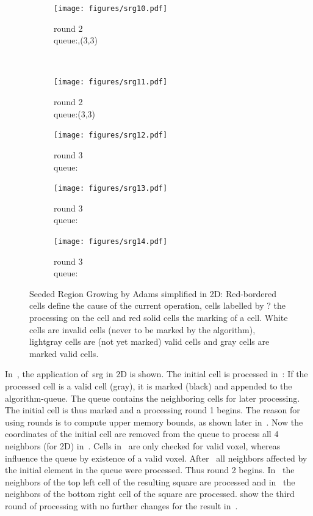 \documentclass{article}
\begin{document}
\begin{figure}[h]
\begin{subfigure}[b]{0.2\linewidth}
\centering
  \texttt{[image: figures/srg10.pdf]}
  \caption{round 2\\queue:,(3,3)}\label{fig:M10}%
\end{subfigure}\\%
\begin{subfigure}[b]{0.2\linewidth}%
\centering
  \texttt{[image: figures/srg11.pdf]}
\caption{round 2\\queue:(3,3)}\label{fig:M11}%
\end{subfigure}%
\begin{subfigure}[b]{0.2\linewidth}%
\centering
  \texttt{[image: figures/srg12.pdf]}
  \caption{round 3\\queue:}\label{fig:M12}%
\end{subfigure}%
\begin{subfigure}[b]{0.2\linewidth}%
\centering
  \texttt{[image: figures/srg13.pdf]}
\caption{round 3\\queue:}\label{fig:M13}%
\end{subfigure}%
\begin{subfigure}[b]{0.2\linewidth}%
\centering
  \texttt{[image: figures/srg14.pdf]}
\caption{round 3\\queue:}\label{fig:M14}%
\end{subfigure}%
\caption{Seeded Region Growing by Adams simplified in 2D: Red-bordered cells define the cause of the current operation, cells labelled by ? the processing on the cell and red solid cells the marking of a cell.
White cells are invalid cells (never to be marked by the algorithm), lightgray cells are (not yet marked) valid cells and gray cells are marked valid cells.} \label{fig:srg2d}
\end{figure}

In~, the application of~\ac{srg} in 2D is shown.
The initial cell is processed in~:
If the processed cell is a valid cell (gray), it is marked (black) and appended to the algorithm-queue.
The queue contains the neighboring cells for later processing.
The initial cell is thus marked and a processing round 1 begins.
The reason for using rounds is to compute upper memory bounds, as shown later in~.
Now the coordinates of the initial cell are removed from the queue to process all 4 neighbors (for 2D) in~.
Cells in~ are only checked for valid voxel, whereas~ influence the queue by existence of a valid voxel.
After~ all neighbors affected by the initial element in the queue were processed.
Thus round 2 begins.
In~ the neighbors of the top left cell of the resulting square are processed and in~ the neighbors of the bottom right cell of the square are processed.
 show the third round of processing with no further changes for the result in~.
\end{document}
